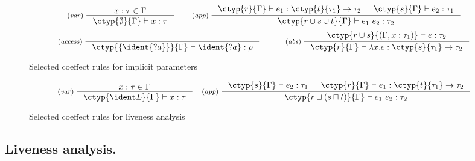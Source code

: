 \begin{figure}[t]
\vspace{-1.4em}
\begin{equation*}
\inference[(\emph{var})\;]
  {x : \tau \in \Gamma}
  {\ctyp{\emptyset}{\Gamma} \vdash x : \tau }
%
\quad\quad
%
\inference[(\emph{app})\;]
  {\ctyp{r}{\Gamma} \vdash e_1 : \ctyp{t}{\tau_1} \rightarrow \tau_2 &
   \ctyp{s}{\Gamma} \vdash e_2 : \tau_1 }
  {\ctyp{r \cup s \cup t}{\Gamma} \vdash e_1~e_2 : \tau_2}
\end{equation*}
\vspace{-0.7em}
\begin{equation*}
\inference[(\emph{access})\;]
  {}
  {\ctyp{ \{\ident{?a} \} }{\Gamma} \vdash \ident{?a} : \rho }
%
\quad\quad\quad
%
\inference[(\emph{abs})\;]
  {\ctyp{r \cup s}{(\Gamma, x:\tau_1)} \vdash e : \tau_2}
  {\ctyp{r}{\Gamma} \vdash \lambda x.e : \ctyp{s}{\tau_1} \rightarrow \tau_2 }
\end{equation*}
\vspace{-0.9em}
\caption{Selected coeffect rules for implicit parameters}
\label{fig:example-resources}
\vspace{-1em}
\end{figure}


\begin{figure}[!b]
\vspace{-2em}
\begin{equation*}
\inference[(\emph{var})\;]
  {x : \tau \in \Gamma}
  {\ctyp{\ident L}{\Gamma} \vdash x : \tau }
\quad
\inference[(\emph{app})\;]
  { \ctyp{s}{\Gamma} \vdash e_2 : \tau_1 &
    \ctyp{r}{\Gamma} \vdash e_1 : \ctyp{t}{\tau_1} \rightarrow \tau_2 }
  {\ctyp{r \sqcup (s \sqcap t)}{\Gamma} \vdash e_1~e_2 : \tau_2}
\end{equation*}
\vspace{-1.5em}
\caption{Selected coeffect rules for liveness analysis}
\label{fig:example-need}
\vspace{-1.2em}
\end{figure}


\vspace{-1em}
\subsection{Liveness analysis.}

